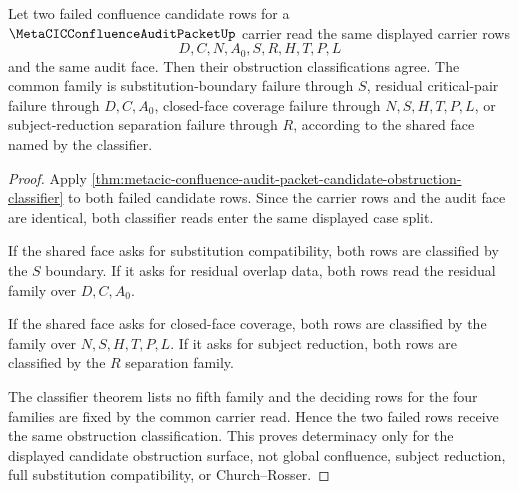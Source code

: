 \begin{theorem}
\label{thm:metacic-confluence-audit-candidate-obstruction-determinacy}
Let two failed confluence candidate rows for a $\MetaCICConfluenceAuditPacketUp$ carrier read the same displayed carrier rows
$$
D,C,N,A_0,S,R,H,T,P,L
$$
and the same audit face. Then their obstruction classifications agree. The common family is substitution-boundary failure through $S$, residual critical-pair failure through $D,C,A_0$, closed-face coverage failure through $N,S,H,T,P,L$, or subject-reduction separation failure through $R$, according to the shared face named by the classifier.
\end{theorem}
\begin{proof}
Apply \autoref{thm:metacic-confluence-audit-packet-candidate-obstruction-classifier} to both failed candidate rows. Since the carrier rows and the audit face are identical, both classifier reads enter the same displayed case split.

If the shared face asks for substitution compatibility, both rows are classified by the $S$ boundary. If it asks for residual overlap data, both rows read the residual family over $D,C,A_0$.

If the shared face asks for closed-face coverage, both rows are classified by the family over $N,S,H,T,P,L$. If it asks for subject reduction, both rows are classified by the $R$ separation family.

The classifier theorem lists no fifth family and the deciding rows for the four families are fixed by the common carrier read. Hence the two failed rows receive the same obstruction classification. This proves determinacy only for the displayed candidate obstruction surface, not global confluence, subject reduction, full substitution compatibility, or Church--Rosser.
\end{proof}

